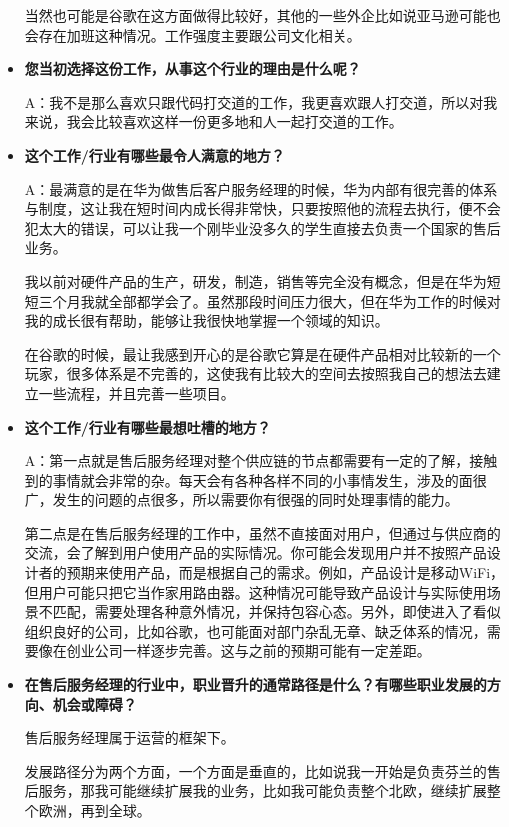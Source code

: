\begin{itemize}
当然也可能是谷歌在这方面做得比较好，其他的一些外企比如说亚马逊可能也会存在加班这种情况。工作强度主要跟公司文化相关。

    \item \textbf{您当初选择这份工作，从事这个行业的理由是什么呢？} 
    
    A：我不是那么喜欢只跟代码打交道的工作，我更喜欢跟人打交道，所以对我来说，我会比较喜欢这样一份更多地和人一起打交道的工作。
    
    \item \textbf{这个工作/行业有哪些最令人满意的地方？}
    
    A：最满意的是在华为做售后客户服务经理的时候，华为内部有很完善的体系与制度，这让我在短时间内成长得非常快，只要按照他的流程去执行，便不会犯太大的错误，可以让我一个刚毕业没多久的学生直接去负责一个国家的售后业务。

我以前对硬件产品的生产，研发，制造，销售等完全没有概念，但是在华为短短三个月我就全部都学会了。虽然那段时间压力很大，但在华为工作的时候对我的成长很有帮助，能够让我很快地掌握一个领域的知识。

在谷歌的时候，最让我感到开心的是谷歌它算是在硬件产品相对比较新的一个玩家，很多体系是不完善的，这使我有比较大的空间去按照我自己的想法去建立一些流程，并且完善一些项目。


    \item \textbf{这个工作/行业有哪些最想吐槽的地方？}

    A：第一点就是售后服务经理对整个供应链的节点都需要有一定的了解，接触到的事情就会非常的杂。每天会有各种各样不同的小事情发生，涉及的面很广，发生的问题的点很多，所以需要你有很强的同时处理事情的能力。

第二点是在售后服务经理的工作中，虽然不直接面对用户，但通过与供应商的交流，会了解到用户使用产品的实际情况。你可能会发现用户并不按照产品设计者的预期来使用产品，而是根据自己的需求。例如，产品设计是移动WiFi，但用户可能只把它当作家用路由器。这种情况可能导致产品设计与实际使用场景不匹配，需要处理各种意外情况，并保持包容心态。另外，即使进入了看似组织良好的公司，比如谷歌，也可能面对部门杂乱无章、缺乏体系的情况，需要像在创业公司一样逐步完善。这与之前的预期可能有一定差距。


    \item \textbf{在售后服务经理的行业中，职业晋升的通常路径是什么？有哪些职业发展的方向、机会或障碍？}

    售后服务经理属于运营的框架下。

发展路径分为两个方面，一个方面是垂直的，比如说我一开始是负责芬兰的售后服务，那我可能继续扩展我的业务，比如我可能负责整个北欧，继续扩展整个欧洲，再到全球。


\end{itemize}
